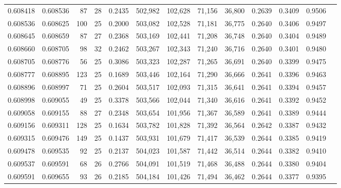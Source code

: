 \begin{tabular}{rrrrrrrrrrrrr}
0.608418 & 0.608536 &  87 &  28 &                                     0.2435 & 502,982 & 102,628 &  71,156 &  36,800 & 0.2639 & 0.3409 & 0.9506 \\
0.608536 & 0.608625 & 100 &  25 &                                     0.2000 & 503,082 & 102,528 &  71,181 &  36,775 & 0.2640 & 0.3406 & 0.9497 \\
0.608645 & 0.608659 &  87 &  27 &                                     0.2368 & 503,169 & 102,441 &  71,208 &  36,748 & 0.2640 & 0.3404 & 0.9489 \\
0.608660 & 0.608705 &  98 &  32 &                                     0.2462 & 503,267 & 102,343 &  71,240 &  36,716 & 0.2640 & 0.3401 & 0.9480 \\
0.608705 & 0.608776 &  56 &  25 &                                     0.3086 & 503,323 & 102,287 &  71,265 &  36,691 & 0.2640 & 0.3399 & 0.9475 \\
0.608777 & 0.608895 & 123 &  25 &                                     0.1689 & 503,446 & 102,164 &  71,290 &  36,666 & 0.2641 & 0.3396 & 0.9463 \\
0.608896 & 0.608997 &  71 &  25 &                                     0.2604 & 503,517 & 102,093 &  71,315 &  36,641 & 0.2641 & 0.3394 & 0.9457 \\
0.608998 & 0.609055 &  49 &  25 &                                     0.3378 & 503,566 & 102,044 &  71,340 &  36,616 & 0.2641 & 0.3392 & 0.9452 \\
0.609058 & 0.609155 &  88 &  27 &                                     0.2348 & 503,654 & 101,956 &  71,367 &  36,589 & 0.2641 & 0.3389 & 0.9444 \\
0.609156 & 0.609311 & 128 &  25 &                                     0.1634 & 503,782 & 101,828 &  71,392 &  36,564 & 0.2642 & 0.3387 & 0.9432 \\
0.609315 & 0.609476 & 149 &  25 &                                     0.1437 & 503,931 & 101,679 &  71,417 &  36,539 & 0.2644 & 0.3385 & 0.9419 \\
0.609478 & 0.609535 &  92 &  25 &                                     0.2137 & 504,023 & 101,587 &  71,442 &  36,514 & 0.2644 & 0.3382 & 0.9410 \\
0.609537 & 0.609591 &  68 &  26 &                                     0.2766 & 504,091 & 101,519 &  71,468 &  36,488 & 0.2644 & 0.3380 & 0.9404 \\
0.609591 & 0.609655 &  93 &  26 &                                     0.2185 & 504,184 & 101,426 &  71,494 &  36,462 & 0.2644 & 0.3377 & 0.9395 \\

\end{tabular}

